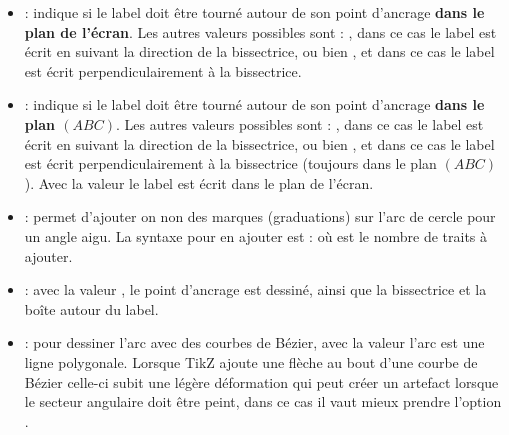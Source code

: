 \begin{itemize}
    \item {} : indique si le label doit être tourné autour de son point d'ancrage \textbf{dans le plan de l'écran}. Les autres valeurs possibles sont : , dans ce cas le label est écrit en suivant la direction de la bissectrice, ou bien , et dans ce cas le label est écrit perpendiculairement à la bissectrice.
    
    \item {} : indique si le label doit être tourné autour de son point d'ancrage \textbf{dans le plan $(ABC)$}. Les autres valeurs possibles sont : , dans ce cas le label est écrit en suivant la direction de la bissectrice, ou bien , et dans ce cas le label est écrit perpendiculairement à la bissectrice (toujours dans le plan $(ABC)$). Avec la valeur  le label est écrit dans le plan de l'écran.
    
    \item {} : permet d'ajouter on non des marques (graduations) sur l'arc de cercle pour un angle aigu. La syntaxe pour en ajouter est :  où  est le nombre de traits à ajouter.
    
    \item {} : avec la valeur \true, le point d'ancrage est dessiné,  ainsi que la bissectrice et la boîte autour du label.
    
    \item {} : pour dessiner l'arc avec des courbes de Bézier, avec la valeur \false l'arc est une ligne polygonale. Lorsque TikZ ajoute une flèche au bout d'une courbe de Bézier celle-ci subit une légère déformation qui peut créer un artefact lorsque le secteur angulaire doit être peint, dans ce cas il vaut mieux prendre l'option .
\end{itemize}

